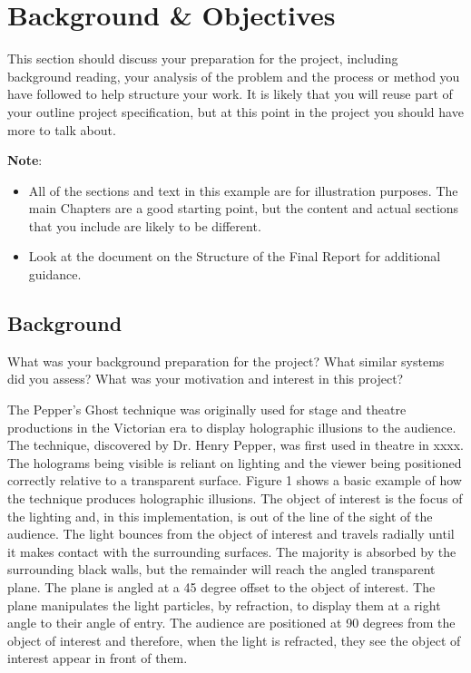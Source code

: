 \chapter{Background \& Objectives}

This section should discuss your preparation for the project, including background reading, your analysis of the problem and the process or method you have followed to help structure your work.  It is likely that you will reuse part of your outline project specification, but at this point in the project you should have more to talk about. 

\textbf{Note}: 

\begin{itemize}
   \item All of the sections and text in this example are for illustration purposes. The main Chapters are a good starting point, but the content and actual sections that you include are likely to be different.
   
   \item Look at the document on the Structure of the Final Report for additional guidance. 
   
\end {itemize}

\section{Background}
What was your background preparation for the project? What similar systems did you assess? What was your motivation and interest in this project?

The Pepper's Ghost technique was originally used for stage and theatre productions in the Victorian era to display holographic illusions to the audience. The technique, discovered by Dr. Henry Pepper, was first used in theatre in xxxx. The holograms being visible is reliant on lighting and the viewer being positioned correctly relative to a transparent surface. Figure 1 shows a basic example of how the technique produces holographic illusions. The object of interest is the focus of the lighting and, in this implementation, is out of the line of the sight of the audience. The light bounces from the object of interest and travels radially until it makes contact with the surrounding surfaces. The majority is absorbed by the surrounding black walls, but the remainder will reach the angled transparent plane. The plane is angled at a 45 degree offset to the object of interest. The plane manipulates the light particles, by refraction, to display them at a right angle to their angle of entry. The audience are positioned at 90 degrees from the object of interest and therefore, when the light is refracted, they see the object of interest appear in front of them. 

